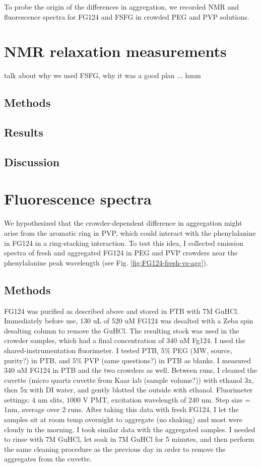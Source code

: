 To probe the origin of the differences in aggregation, we recorded NMR and fluorescence spectra for FG124 and FSFG in crowded PEG and PVP solutions.

\section{NMR relaxation measurements}
talk about why we used FSFG, why it was a good plan ... hmm
\subsection{Methods}
\subsection{Results}
\subsection{Discussion}

\section{Fluorescence spectra}
We hypothesized that the crowder-dependent difference in aggregation might arise from the aromatic ring in PVP, which could interact with the phenylalanine in FG124 in a ring-stacking interaction.  To test this idea, I collected emission spectra of fresh and aggregated FG124 in PEG and PVP crowders near the phenylalanine peak wavelength (see Fig. \ref{fig:FG124-fresh-vs-agg}). 
\subsection{Methods}
FG124 was purified as described above and stored in PTB with 7M GuHCl.  Immediately before use, 130 uL of 520 uM FG124 was desalted with a Zeba spin desalting column to remove the GuHCl.  The resulting stock was used in the crowder samples, which had a final concentration of 340 uM Fg124.  I used the shared-instrumentation fluorimeter.  I tested PTB, 5\% PEG (MW, source, purity?) in PTB, and 5\% PVP (same questions?) in PTB as blanks.  I measured 340 uM FG124 in PTB and the two crowders as well.  Between runs, I cleaned the cuvette (micro quartz cuvette from Kaar lab (sample volume?)) with ethanol 3x, then 5x with DI water, and gently blotted the outside with ethanol.  Fluorimeter settings: 4 nm slits, 1000 V PMT, excitation wavelength of 240 nm.  Step size  = 1nm, average over 2 runs.  After taking this data with fresh FG124, I let the samples sit at room temp overnight to aggregate (no shaking) and most were cloudy in the morning.  I took similar data with the aggregated samples.  I needed to rinse with 7M GuHCl, let soak in 7M GuHCl for 5 minutes, and then perform the same cleaning procedure as the previous day in order to remove the aggregates from the cuvette.
